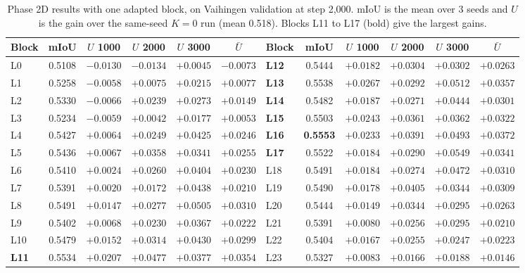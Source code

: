 \documentclass[11pt,a4paper]{report}
\begin{document}
\begin{table}[t]
\centering
\caption{Phase 2D results with one adapted block, on Vaihingen validation at step 2,000. mIoU is the mean over 3 seeds and $U$ is the gain over the same-seed $K = 0$ run (mean 0.518). Blocks L11 to L17 (bold) give the largest gains.}
\label{tab:k1}
\footnotesize
\setlength{\tabcolsep}{3.5pt}
\begin{tabular}{@{}lccccc@{\hspace{0.5cm}}lccccc@{}}
\toprule
\textbf{Block} & \textbf{mIoU} & \textbf{$U$ 1000} & \textbf{$U$ 2000} & \textbf{$U$ 3000} & \textbf{$\bar U$} &
\textbf{Block} & \textbf{mIoU} & \textbf{$U$ 1000} & \textbf{$U$ 2000} & \textbf{$U$ 3000} & \textbf{$\bar U$} \\
\midrule
L0  & 0.5108 & $-0.0130$ & $-0.0134$ & $+0.0045$ & $-0.0073$ & \textbf{L12} & 0.5444 & $+0.0182$ & $+0.0304$ & $+0.0302$ & $+0.0263$ \\
L1  & 0.5258 & $-0.0058$ & $+0.0075$ & $+0.0215$ & $+0.0077$ & \textbf{L13} & 0.5538 & $+0.0267$ & $+0.0292$ & $+0.0512$ & $+0.0357$ \\
L2  & 0.5330 & $-0.0066$ & $+0.0239$ & $+0.0273$ & $+0.0149$ & \textbf{L14} & 0.5482 & $+0.0187$ & $+0.0271$ & $+0.0444$ & $+0.0301$ \\
L3  & 0.5234 & $-0.0059$ & $+0.0042$ & $+0.0177$ & $+0.0053$ & \textbf{L15} & 0.5503 & $+0.0243$ & $+0.0361$ & $+0.0362$ & $+0.0322$ \\
L4  & 0.5427 & $+0.0064$ & $+0.0249$ & $+0.0425$ & $+0.0246$ & \textbf{L16} & \textbf{0.5553} & $+0.0233$ & $+0.0391$ & $+0.0493$ & $\mathbf{+0.0372}$ \\
L5  & 0.5436 & $+0.0067$ & $+0.0358$ & $+0.0341$ & $+0.0255$ & \textbf{L17} & 0.5522 & $+0.0184$ & $+0.0290$ & $+0.0549$ & $+0.0341$ \\
L6  & 0.5410 & $+0.0024$ & $+0.0260$ & $+0.0404$ & $+0.0230$ & L18 & 0.5491 & $+0.0184$ & $+0.0274$ & $+0.0472$ & $+0.0310$ \\
L7  & 0.5391 & $+0.0020$ & $+0.0172$ & $+0.0438$ & $+0.0210$ & L19 & 0.5490 & $+0.0178$ & $+0.0405$ & $+0.0344$ & $+0.0309$ \\
L8  & 0.5491 & $+0.0147$ & $+0.0277$ & $+0.0505$ & $+0.0310$ & L20 & 0.5444 & $+0.0149$ & $+0.0344$ & $+0.0295$ & $+0.0263$ \\
L9  & 0.5402 & $+0.0068$ & $+0.0230$ & $+0.0367$ & $+0.0222$ & L21 & 0.5391 & $+0.0080$ & $+0.0256$ & $+0.0295$ & $+0.0210$ \\
L10 & 0.5479 & $+0.0152$ & $+0.0314$ & $+0.0430$ & $+0.0299$ & L22 & 0.5404 & $+0.0167$ & $+0.0255$ & $+0.0247$ & $+0.0223$ \\
\textbf{L11} & 0.5534 & $+0.0207$ & $+0.0477$ & $+0.0377$ & $+0.0354$ & L23 & 0.5327 & $+0.0083$ & $+0.0166$ & $+0.0188$ & $+0.0146$ \\
\bottomrule
\end{tabular}
\end{table}
\end{document}

